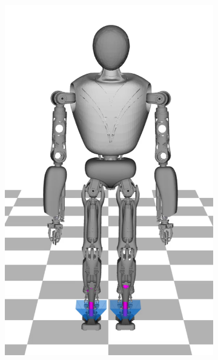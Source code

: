 \begin{figure}
\begin{subfigure}{.16\textwidth}
	\includegraphics[width=.95\linewidth]{fig/walkStatic/snaps/1}
	\caption{}
\end{subfigure}%
\begin{subfigure}{.16\textwidth}

\end{subfigure}
\end{figure}
